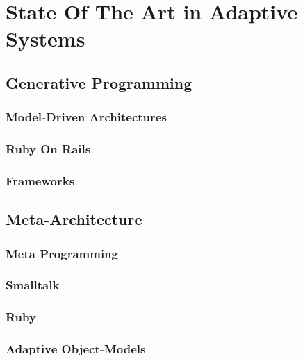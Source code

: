 \chapter{State Of The Art in Adaptive Systems}\label{chap:sota}

\section{Generative Programming}\label{sec:generative_programming}

\subsection{Model-Driven Architectures}\label{sec:mda}

\subsection{Ruby On Rails}\label{sec:ror}

\subsection{Frameworks}\label{sec:frameworks}


\section{Meta-Architecture}\label{sec:meta-architecture}

\subsection{Meta Programming}\label{sec:metaprogramming}

\subsection{Smalltalk}\label{sec:smalltalk}

\subsection{Ruby}\label{sec:ruby}

\subsection{Adaptive Object-Models}\label{sec:aom}

